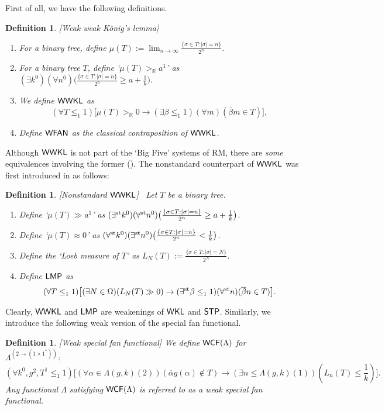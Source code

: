 \documentclass[reqno]{amsart}
\newtheorem{defi}[thm]{Definition}
\newcommand\be{\begin{equation}}
\newcommand\ee{\end{equation}}
\def\bdefi{\begin{defi}\rm}
\def\edefi{\end{defi}}
\def\STP{\textup{\textsf{STP}}}
\def\WKL{\textup{\textsf{WKL}}}
\def\WWKL{\textup{\textsf{WWKL}}}
\def\R{{\mathbb  R}}
\def\WFAN{\textup{\textsf{WFAN}}}
\def\st{\textup{st}}
\def\di{\rightarrow}
\def\LMP{\textup{\textsf{LMP}}}
\def\WCF{\textup{\textsf{WCF}}}
\numberwithin{equation}{section}
\numberwithin{thm}{section}
\begin{document}
\medskip

First of all, we have the following definitions.  
\bdefi[Weak weak K\"onig's lemma]\label{leipi}~
\begin{enumerate}
\item For a binary tree, define $\mu(T):=\lim_{n\di \infty}\frac{\{\sigma \in T: |\sigma|=n    \}}{2^{n}}$.
\item For a binary tree $T$, define `$\mu(T)>_{\R}a^{1}$' as $(\exists k^{0})(\forall n^{0})\big(\frac{\{\sigma \in T: |\sigma|=n    \}}{2^{n}}\geq a+\frac{1}{k}\big)$.
\item We define $\WWKL$ as 
\[
(\forall T \leq_{1}1)\big[ \mu(T)>_{\R}0\di (\exists \beta\leq_{1}1)(\forall m)(\overline{\beta}m\in T) \big],
\]
\item Define $\WFAN$ as the classical contraposition of $\WWKL$.  
\end{enumerate}     
\edefi
Although $\WWKL$ is not part of the `Big Five' systems of RM, there are \emph{some} equivalences involving the former (\cite{yussie, sayo, yuppie, simpson2}).    
The nonstandard counterpart of $\WWKL$ was first introduced in \cite{kei1} as follows:  
\bdefi[Nonstandard $\WWKL$]\label{leipi2}~
Let $T$ be a binary tree.  
\begin{enumerate}
\item Define `$\mu(T)\gg a^{1}$' as $(\exists^{\st} k^{0})(\forall^{\st} n^{0})\big(\frac{\{\sigma \in T: |\sigma|=n    \}}{2^{n}}\geq a+\frac{1}{k}\big)$.
\item Define `$\mu(T)\approx 0$' as $(\forall^{\st} k^{0})(\exists^{\st} n^{0})\big(\frac{\{\sigma \in T: |\sigma|=n    \}}{2^{n}}< \frac{1}{k}\big)$.
\item Define the `Loeb measure of $T$' as $L_{N}(T):=\frac{\{\sigma \in T: |\sigma|=N   \}}{2^{N}}$.
\item Define $\LMP$ as 
\be\label{fanzzz}
(\forall   T \leq_{1}1)\big[  (\exists N\in \Omega)(L_{N}(T)\gg 0) \di (\exists^{\st} \beta\leq_{1}1)(\forall^{\st}n)(\overline{\beta}n\in T)\big].
\ee

\end{enumerate}     
\edefi
Clearly, $\WWKL$ and $\LMP$ are weakenings of $\WKL$ and $\STP$.  Similarly, we introduce the following weak version of the special fan functional. 
\bdefi[Weak special fan functional] 
We define $\WCF(\Lambda)$ for $\Lambda^{(2\di (1\times 1^{*}))}$:
\[\textstyle
(\forall k^{0},g^{2}, T^{1}\leq_{1}1)\big[(\forall \alpha \in \Lambda(g,k)(2))  (\overline{\alpha}g(\alpha)\not\in T)
\di   (\exists n\leq\Lambda(g,k)(1) ) (L_{n}(T)\leq\frac{1}{k})\big].
\]
Any functional $\Lambda$ satisfying $\WCF(\Lambda)$ is referred to as a \emph{weak special fan functional}.
\edefi
\end{document}
